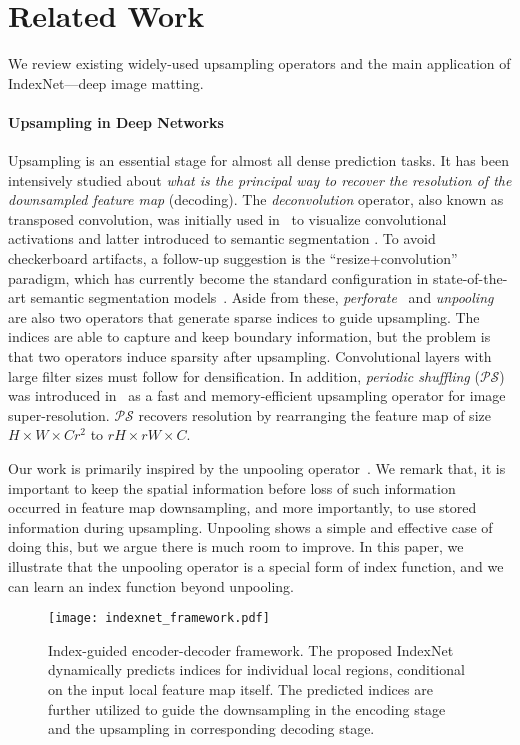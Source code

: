\documentclass[10pt,twocolumn,letterpaper]{article}
\begin{document}
\section{Related Work}

We review existing widely-used upsampling operators and the main application of IndexNet---deep image matting.

\paragraph{Upsampling in Deep Networks}
Upsampling is an essential stage for almost all dense prediction tasks.
It has been intensively studied about \textit{what is the principal way to recover the resolution of the downsampled feature map} (decoding). The \textit{deconvolution} operator, also known as transposed convolution, was initially used  in~\cite{zeiler2014visualizing} to visualize convolutional activations and latter introduced to semantic segmentation \cite{long2015fully}.
To avoid checkerboard artifacts, a follow-up suggestion is the ``resize+convolution'' paradigm, which has currently become the standard configuration in state-of-the-art semantic segmentation models~\cite{chen18v3,lin2017refine}. Aside from these, \textit{perforate}~\cite{osendorfer2014image} and \textit{unpooling}~\cite{badrinarayanan2017segnet} are also two operators that generate sparse indices to guide upsampling. The indices are able to capture and keep boundary information, but the problem is that two operators induce sparsity after upsampling. Convolutional layers with large filter sizes must follow for densification. In addition, \textit{periodic shuffling} ($\mathcal{PS}$) was introduced in~\cite{shi2016real} as a fast and memory-efficient upsampling  operator for image super-resolution. $\mathcal{PS}$ recovers resolution by rearranging the feature map of size $H\times W\times Cr^2$ to $rH\times rW\times C$.

Our work is primarily inspired by the unpooling operator~\cite{badrinarayanan2017segnet}. We remark that, it is important to keep  the spatial information before loss of such information occurred in feature map downsampling, and more importantly, to use stored information during upsampling. Unpooling shows a simple and effective case of doing this, but we argue there is much room to improve. In this paper, we illustrate that the unpooling operator is a special form of index function, and we can learn an index function beyond unpooling.

\begin{figure*}[!tb]
	\captionsetup{font=small,singlelinecheck=true}
	\setlength{\abovecaptionskip}{10pt}
	\centering
	\texttt{[image: indexnet\_framework.pdf]}
\caption{Index-guided encoder-decoder framework. The proposed \mbox{IndexNet} dynamically predicts indices for individual local regions, conditional on the input local feature map itself. The predicted indices are further utilized to guide the downsampling in the encoding stage and the upsampling in corresponding decoding stage.}
	\label{fig:framework}
\end{figure*}
\end{document}
